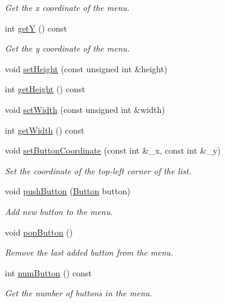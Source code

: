 \begin{DoxyCompactItemize}
\begin{DoxyCompactList}\small\item\em Get the x coordinate of the menu. \end{DoxyCompactList}\item 
int \mbox{\hyperlink{class_menu_a2daa248a3bc22bfbd0931337ea8299ae}{getY}} () const
\begin{DoxyCompactList}\small\item\em Get the y coordinate of the menu. \end{DoxyCompactList}\item 
void \mbox{\hyperlink{class_menu_a54f1e7a7bb1cd809477f8e8b2e578366}{set\+Height}} (const unsigned int \&height)
\item 
int \mbox{\hyperlink{class_menu_a67f414acad54c237dc321a28b6ca723a}{get\+Height}} () const
\item 
void \mbox{\hyperlink{class_menu_af6f5271f0f4546168c00467734ab7cd1}{set\+Width}} (const unsigned int \&width)
\item 
int \mbox{\hyperlink{class_menu_a993d925b955146c9e265d16df1371f51}{get\+Width}} () const
\item 
void \mbox{\hyperlink{class_menu_a047e58be0fe7583a1a79c2614a986f1b}{set\+Button\+Coordinate}} (const int \&\+\_\+x, const int \&\+\_\+y)
\begin{DoxyCompactList}\small\item\em Set the coordinate of the top-\/left corner of the list. \end{DoxyCompactList}\item 
void \mbox{\hyperlink{class_menu_aec502b8f392fd6c88078f95522d9b50d}{push\+Button}} (\mbox{\hyperlink{class_button}{Button}} button)
\begin{DoxyCompactList}\small\item\em Add new button to the menu. \end{DoxyCompactList}\item 
void \mbox{\hyperlink{class_menu_a674cd38ddc325b22ec9364e7f83f0b6d}{pop\+Button}} ()
\begin{DoxyCompactList}\small\item\em Remove the last added button from the menu. \end{DoxyCompactList}\item 
int \mbox{\hyperlink{class_menu_aa0878bc89af6cb4b96132966af62b1e0}{num\+Button}} () const
\begin{DoxyCompactList}\small\item\em Get the number of buttons in the menu. \end{DoxyCompactList}\item 

\end{DoxyCompactItemize}
